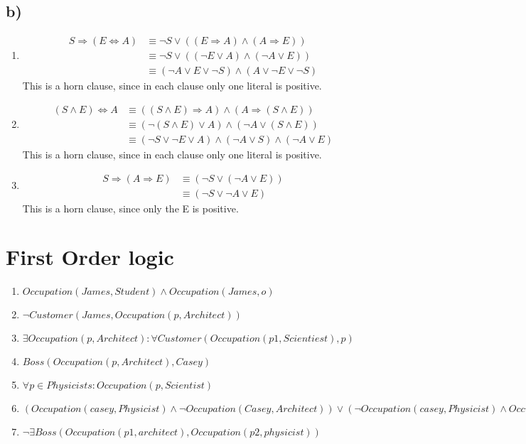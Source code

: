 \documentclass[a4paper]{article}
\begin{document}
\subsection*{b)}
\begin{enumerate}
	\item 
		\begin{align*}
			S \Rightarrow (E \Leftrightarrow A) 
			&\equiv \neg S \lor ((E \Rightarrow A) \land (A \Rightarrow E)) \\ 
			&\equiv \neg S \lor ((\neg E \lor A) \land (\neg A \lor E)) \\ 
			&\equiv (\neg A \lor E \lor \neg S) \land (A \lor  \neg E \lor \neg S)
		\end{align*}
		This is a horn clause, since in each clause only one literal is positive.
	\item 
		\begin{align*} 
			(S \land E) \Leftrightarrow A 
			&\equiv ((S \land E) \Rightarrow A) \land (A \Rightarrow (S \land E)) \\ 
			&\equiv (\neg(S \land E) \lor A) \land (\neg A \lor (S \land E)) \\ 
			&\equiv (\neg S \lor \neg E \lor A) \land (\neg A \lor S) \land (\neg A \lor E)
		\end{align*} 
		This is a horn clause, since in each clause only one literal is positive.
	\item  
		\begin{align*}
			S \Rightarrow (A \Rightarrow E) 
			&\equiv (\neg S \lor (\neg A \lor E)) \\ 
			&\equiv (\neg S \lor \neg A \lor E)
		\end{align*}
		This is a horn clause, since only the E is positive.
\end{enumerate}
\section{First Order logic}
\begin{enumerate}[label=(\alph*)]
	\item $Occupation(James, Student) \land Occupation(James, o)$
	\item $\neg Customer(James, Occupation(p, Architect))$
	\item $\exists Occupation(p, Architect): \forall Customer(Occupation(p1, Scientiest),p)$
	\item $Boss(Occupation(p, Architect), Casey)$
	\item $\forall p \in  Physicists: Occupation(p, Scientist)$
	\item $( Occupation(casey, Physicist) \land \neg Occupation(Casey, Architect) ) \lor (\neg Occupation(casey, Physicist) \land  Occupation(Casey, Architect))$
	\item $\neg \exists Boss(Occupation(p1, architect), Occupation(p2, physicist))$
\end{enumerate}
\end{document}
